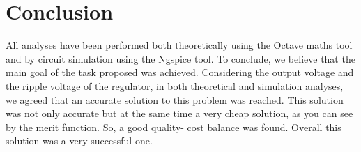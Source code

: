 \section{Conclusion}
\label{resan}
All analyses have been performed both theoretically using the Octave maths tool and by circuit simulation using the Ngspice tool.
To conclude, we believe that the main goal of the task proposed was achieved. Considering the output voltage and the ripple voltage of the regulator, in both theoretical and simulation analyses, we agreed that an accurate solution to this problem was reached. This solution was not only accurate but at the same time a very cheap solution, as you can see by the merit function. So, a good quality- cost balance was found. Overall this solution was a very successful one.  

